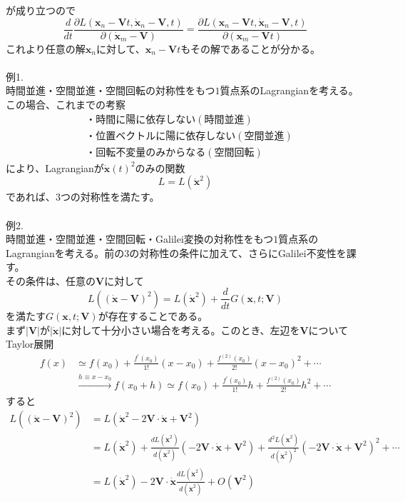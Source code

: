 \documentclass{jsarticle}
\begin{document}
が成り立つので
\[\frac{d}{dt}\frac{\partial L(\bm{x}_{n}-\bm{V}t,\dot{\bm{x}}_{n}-\bm{V},t)}{\partial(\dot{\bm{x}}_{m}-\bm{V})}=\frac{\partial L(\bm{x}_{n}-\bm{V}t,\dot{\bm{x}}_{n}-\bm{V},t)}{\partial(\bm{x}_{m}-\bm{V}t)}\]
これより任意の解\(\bm{x}_{n}\)に対して、\(\bm{x}_{n}-\bm{V}t\)もその解であることが分かる。\\
\\
例1.\\
時間並進・空間並進・空間回転の対称性をもつ\(1\)質点系のLagrangianを考える。この場合、これまでの考察
\begin{align*}
&・時間に陽に依存しない(時間並進)\\
&・位置ベクトルに陽に依存しない(空間並進)\\
&・回転不変量のみからなる(空間回転)
\end{align*}
により、Lagrangianが\(\dot{\bm{x}}(t)^{2}\)のみの関数
\[L=L(\dot{\bm{x}}^{2})\]
であれば、\(3\)つの対称性を満たす。\\
\\
例2.\\
時間並進・空間並進・空間回転・Galilei変換の対称性をもつ\(1\)質点系のLagrangianを考える。前の\(3\)の対称性の条件に加えて、さらにGalilei不変性を課す。\\
その条件は、任意の\(\bm{V}\)に対して
\[L((\dot{\bm{x}}-\bm{V})^{2})=L(\dot{\bm{x}}^{2})+\frac{d}{dt}G(\bm{x},t;\bm{V})\]
を満たす\(G(\bm{x},t;\bm{V})\)が存在することである。\\
まず\(|\bm{V}|\)が\(|\dot{\bm{x}}|\)に対して十分小さい場合を考える。このとき、左辺を\(\bm{V}\)についてTaylor展開\begin{align*}
f(x)&\simeq f(x_{0})+\frac{f^{\prime}(x_{0})}{1!}(x-x_{0})+\frac{f^{(2)}(x_{0})}{2!}(x-x_{0})^{2}+\cdots\\
&\xrightarrow{h\equiv x-x_{0}}f(x_{0}+h)\simeq f(x_{0})+\frac{f^{\prime}(x_{0})}{1!}h+\frac{f^{(2)}(x_{0})}{2!}h^{2}+\cdots
\end{align*}
すると
\begin{align*}
L((\dot{\bm{x}}-\bm{V})^{2})&=L(\dot{\bm{x}}^{2}-2\bm{V}\cdot\dot{\bm{x}}+\bm{V}^{2})\\
&=L(\dot{\bm{x}}^{2})+\frac{d L(\dot{\bm{x}}^{2})}{d(\dot{\bm{x}}^{2})}(-2\bm{V}\cdot\dot{\bm{x}}+\bm{V}^{2})+\frac{d^{2}L(\dot{\bm{x}}^{2})}{d(\dot{\bm{x}}^{2})^{2}}(-2\bm{V}\cdot\dot{\bm{x}}+\bm{V}^{2})^{2}+\cdots\\
&=L(\dot{\bm{x}}^{2})-2\bm{V}\cdot\dot{\bm{x}}\frac{d L(\dot{\bm{x}}^{2})}{d(\dot{\bm{x}}^{2})}+O\left(\bm{V}^{2}\right)
\end{align*}
\end{document}
